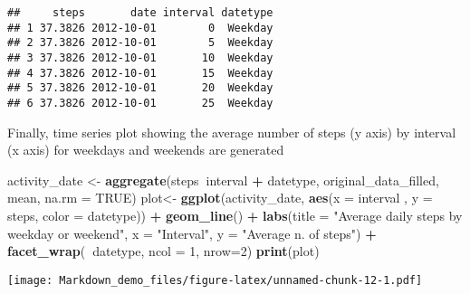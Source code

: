 \documentclass[]{article}
\newenvironment{Shaded}{\begin{snugshade}}{\end{snugshade}}
\newcommand{\KeywordTok}[1]{\textcolor[rgb]{0.13,0.29,0.53}{\textbf{#1}}}
\newcommand{\DataTypeTok}[1]{\textcolor[rgb]{0.13,0.29,0.53}{#1}}
\newcommand{\DecValTok}[1]{\textcolor[rgb]{0.00,0.00,0.81}{#1}}
\newcommand{\StringTok}[1]{\textcolor[rgb]{0.31,0.60,0.02}{#1}}
\newcommand{\OtherTok}[1]{\textcolor[rgb]{0.56,0.35,0.01}{#1}}
\newcommand{\OperatorTok}[1]{\textcolor[rgb]{0.81,0.36,0.00}{\textbf{#1}}}
\newcommand{\NormalTok}[1]{#1}
\begin{document}
\begin{verbatim}
##     steps       date interval datetype
## 1 37.3826 2012-10-01        0  Weekday
## 2 37.3826 2012-10-01        5  Weekday
## 3 37.3826 2012-10-01       10  Weekday
## 4 37.3826 2012-10-01       15  Weekday
## 5 37.3826 2012-10-01       20  Weekday
## 6 37.3826 2012-10-01       25  Weekday
\end{verbatim}

Finally, time series plot showing the average number of steps (y axis)
by interval (x axis) for weekdays and weekends are generated

\begin{Shaded}
\begin{Highlighting}[]
\NormalTok{activity_date <-}\StringTok{ }\KeywordTok{aggregate}\NormalTok{(steps}\OperatorTok{~}\NormalTok{interval }\OperatorTok{+}\StringTok{ }\NormalTok{datetype, original_data_filled, mean, }\DataTypeTok{na.rm =} \OtherTok{TRUE}\NormalTok{)}
\NormalTok{plot<-}\StringTok{ }\KeywordTok{ggplot}\NormalTok{(activity_date, }\KeywordTok{aes}\NormalTok{(}\DataTypeTok{x =}\NormalTok{ interval , }\DataTypeTok{y =}\NormalTok{ steps, }\DataTypeTok{color =}\NormalTok{ datetype)) }\OperatorTok{+}
\StringTok{  }\KeywordTok{geom_line}\NormalTok{() }\OperatorTok{+}
\StringTok{  }\KeywordTok{labs}\NormalTok{(}\DataTypeTok{title =} \StringTok{"Average daily steps by weekday or weekend"}\NormalTok{, }\DataTypeTok{x =} \StringTok{"Interval"}\NormalTok{, }\DataTypeTok{y =} \StringTok{"Average n. of steps"}\NormalTok{) }\OperatorTok{+}
\StringTok{  }\KeywordTok{facet_wrap}\NormalTok{(}\OperatorTok{~}\NormalTok{datetype, }\DataTypeTok{ncol =} \DecValTok{1}\NormalTok{, }\DataTypeTok{nrow=}\DecValTok{2}\NormalTok{)}
\KeywordTok{print}\NormalTok{(plot)}
\end{Highlighting}
\end{Shaded}

\texttt{[image: Markdown\_demo\_files/figure-latex/unnamed-chunk-12-1.pdf]}
\end{document}
